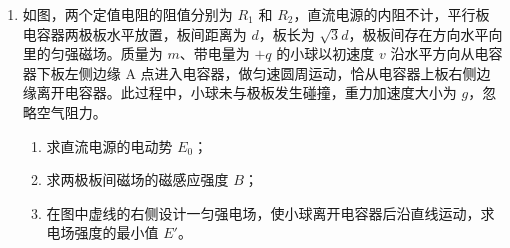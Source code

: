 \documentclass[\gkver]{gaokaozhenti}
\begin{document}
\begin{enumerate}
{（3）从“$\times$1”挡位换成“$\times$10”挡位，即开关 S 从 m 拨向 n，全电路电阻增大，干路电流减小，①、② 短接时，为了使电流表满偏，则需要增大通过电流计 G 所在支路的电流，所以需要将 $R_{0}$ 的滑片向上调节；

（4）在“$\times$10”挡位，电路图结构简化如图


第一次，当 ①、② 短接，全电路的总电阻为

$R = R_{n} + \frac{(R_{G} + R_{0\text{上}})R_{0\text{下}}}{R_{G} + R_{0m}}$

通过干路的电流为

$I = \frac{E}{R}$

电流表满偏，根据并联电路中电流之比等于电阻反比可知

$\frac{I_{G}}{I - I_{G}} = \frac{R_{0\text{下}}}{R_{G} + R_{0\text{上}}}$

第二次，①、② 之间接入 $R_{1} = 100\UO$，全电路总电阻为 $R + R_{1}$，通过干路的电流为

$I_{1} = \frac{E}{R + R_{1}}$

电流表偏转了量程的 $\frac{2}{3}$，则

$\frac{\frac{2}{3}I_{G}}{I_{1} - \frac{2}{3}I_{G}} = \frac{R_{0\text{下}}}{R_{G} + R_{0\text{上}}}$

结合第一次和第二次解得

$R = 2R_{1} = 200\UO$

第三次，①、② 之间接入 $R_{x}$，全电路总电阻为 $R + R_{x}$，通过干路的电流为

$I_{x} = \frac{E}{R + R_{x}}$

电流表偏转了量程的 $\frac{1}{3}$，则

$\frac{\frac{1}{3}I_{G}}{I_{x} - \frac{1}{3}I_{G}} = \frac{R_{0\text{下}}}{R_{G} + R_{0\text{上}}}$

结合第二次和第三次，解得：$R_{x} = R + 2R_{1} = 400\UO$。
}

\item
如图，两个定值电阻的阻值分别为 $R_{1}$ 和 $R_{2}$，直流电源的内阻不计，平行板电容器两极板水平放置，板间距离为 $d$，板长为 $\sqrt{3}d$，极板间存在方向水平向里的匀强磁场。质量为 $m$、带电量为 $+q$ 的小球以初速度 $v$ 沿水平方向从电容器下板左侧边缘 A 点进入电容器，做匀速圆周运动，恰从电容器上板右侧边缘离开电容器。此过程中，小球未与极板发生碰撞，重力加速度大小为 $g$，忽略空气阻力。
\begin{enumerate}
	\item
	求直流电源的电动势 $E_{0}$；
	\item
	求两极板间磁场的磁感应强度 $B$；
	\item
	在图中虚线的右侧设计一匀强电场，使小球离开电容器后沿直线运动，求电场强度的最小值 $E'$。
\end{enumerate}


\end{enumerate}
\end{document}
